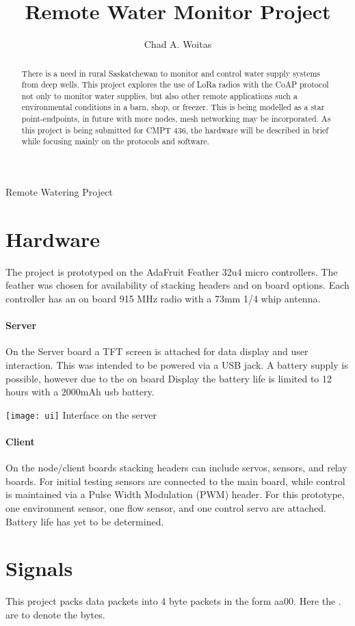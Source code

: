 \documentclass[]{report}
\title{Remote Water Monitor Project}
\author{Chad A. Woitas}
\begin{document}
\maketitle
 Remote Watering Project
\begin{abstract}
	There is a need in rural Saskatchewan to monitor and control water supply systems from deep wells. This project explores the use of LoRa radios with the CoAP protocol not only to monitor water supplies, but also other remote applications such a environmental conditions in a barn, shop, or freezer. This is being modelled as a star point-endpoints, in future with more nodes, mesh networking may be incorporated. As this project is being submitted for CMPT 436, the hardware will be described in brief while focusing mainly on the protocols and software.
\end{abstract}

\section{Hardware}
	The project is prototyped on the AdaFruit Feather 32u4 micro controllers. The feather was chosen for availability of stacking headers and on board options. Each controller has an on board 915 MHz radio with a 73mm 1/4 whip antenna. 
	
	\paragraph{Server}
	On the Server board a TFT screen is attached for data display and user interaction. This was intended to be powered via a USB jack. A battery supply is possible, however due to the on board Display the battery life is limited to 12 hours with a 2000mAh usb battery.
	
	\texttt{[image: ui]}
	Interface on the server
	\paragraph{Client}
	On the node/client boards stacking headers can include servos, sensors, and relay boards. For initial testing sensors are connected to the main board, while control is maintained via a Pulse Width Modulation (PWM) header. For this prototype, one environment sensor, one flow sensor, and one control servo are attached. Battery life has yet to be determined. 
	
	
	
\section{Signals}	
	This project packs data packets into 4 byte packets in the form aa00. Here the . are to denote the bytes.
	
\end{document}
